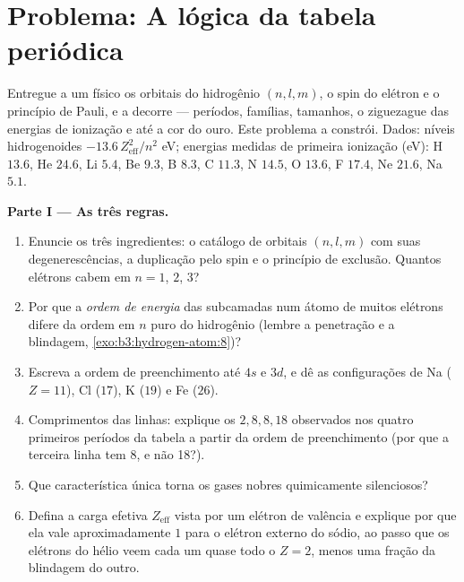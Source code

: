 \section{Problema: A lógica da tabela periódica}

\begin{problem}\label{pb:b3:identical-particles:1}
Entregue a um físico os orbitais do hidrogênio $(n, l, m)$, o spin do
elétron e o princípio de Pauli, e a  decorre ---
períodos, famílias, tamanhos, o ziguezague das energias de ionização e
até a cor do ouro. Este problema a constrói. Dados: níveis
hidrogenoides $-13.6\,Z_{\text{eff}}^2/n^2$ eV; energias medidas de
primeira ionização (eV): H $13.6$, He $24.6$, Li $5.4$, Be $9.3$,
B $8.3$, C $11.3$, N $14.5$, O $13.6$, F $17.4$, Ne $21.6$, Na $5.1$.

\medskip\noindent\textbf{Parte I --- As três regras.}
\begin{enumerate}
  \item Enuncie os três ingredientes: o catálogo de orbitais
        $(n, l, m)$ com suas degenerescências, a duplicação pelo spin e
        o princípio de exclusão. Quantos elétrons cabem em $n = 1$,
        $2$, $3$?
  \item Por que a \emph{ordem de energia} das subcamadas num átomo de
        muitos elétrons difere da ordem em $n$ puro do hidrogênio
        (lembre a penetração e a blindagem,
        \cref{exo:b3:hydrogen-atom:8})?
  \item Escreva a ordem de preenchimento até $4s$ e $3d$, e dê as
        configurações de Na ($Z = 11$), Cl ($17$), K ($19$) e
        Fe ($26$).
  \item Comprimentos das linhas: explique os $2, 8, 8, 18$ observados
        nos quatro primeiros períodos da tabela a partir da ordem de
        preenchimento (por que a terceira linha tem 8, e não 18?).
  \item Que característica única torna os gases nobres quimicamente
        silenciosos?
  \item Defina a carga efetiva $Z_{\text{eff}}$ vista por um elétron de
        valência e explique por que ela vale aproximadamente $1$ para o
        elétron externo do sódio, ao passo que os elétrons do hélio
        veem cada um quase todo o $Z = 2$, menos uma fração da
        blindagem do outro.
\end{enumerate}


\end{problem}
